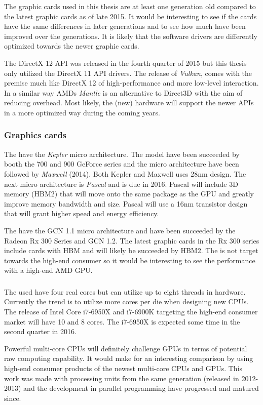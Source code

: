 The graphic cards used in this thesis are at least one generation old compared to the latest graphic cards as of late 2015. It would be interesting to see if the cards have the same differences in later generations and to see how much have been improved over the generations. It is likely that the software drivers are differently optimized towards the newer graphic cards.

The DirectX 12 \gls{API} was released in the fourth quarter of 2015 but this thesis only utilized the DirectX 11 API drivers. The release of \emph{Vulkan}, comes with the premise much like DirectX 12 of high-performance and more low-level interaction. In a similar way AMDs \emph{Mantle} is an alternative to Direct3D with the aim of reducing overhead. Most likely, the (new) hardware will support the newer APIs in a more optimized way during the coming years.

\subsubsection{Graphics cards}

The {\NVCARD} have the \textit{Kepler} micro architecture. The model have been succeeded by booth the 700 and 900 GeForce series and the micro architecture have been followed by \textit{Maxwell} (2014). Both Kepler and Maxwell uses 28nm design. The next micro architecture is \textit{Pascal} and is due in 2016. Pascal will include 3D memory (\gls{HBM2}) that will move onto the same package as the GPU and greatly improve memory bandwidth and size. Pascal will use a 16nm transistor design that will grant higher speed and energy efficiency.

The {\AMDCARD} have the \gls{GCN} 1.1 micro architecture and have been succeeded by the Radeon Rx 300 Series and \gls{GCN} 1.2. The latest graphic cards in the Rx 300 series include cards with \gls{HBM} and will likely be succeeded by \gls{HBM2}. The {\AMDCARD} is not target towards the high-end consumer so it would be interesting to see the performance with a high-end AMD GPU.

\subsubsection{\INTELCPU}

The used {\INTELCPU} have four real cores but can utilize up to eight threads in hardware. Currently the trend is to utilize more cores per die when designing new CPUs. The release of Intel Core i7-6950X and i7-6900K targeting the high-end consumer market will have 10 and 8 cores. The i7-6950X is expected some time in the second quarter in 2016.

Powerful multi-core \gls{CPU}s will definitely challenge GPUs in terms of potential raw computing capability. It would make for an interesting comparison by using high-end consumer products of the newest multi-core CPUs and GPUs. This work was made with processing units from the same generation (released in 2012-2013) and the development in parallel programming have progressed and matured since.